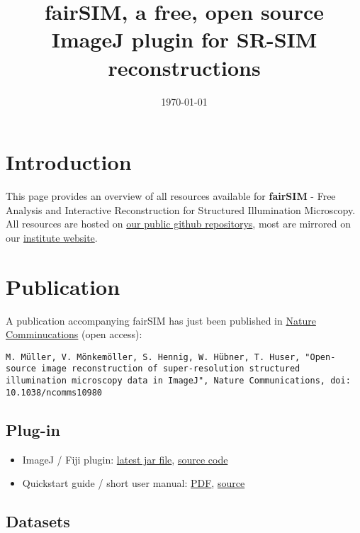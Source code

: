 \documentclass[twoside=false,
           a4paper,
           10pt,DIV=16,parindent=none,parskip=half]{article}
\title{fairSIM, a free, open source ImageJ plugin for SR-SIM reconstructions}
\date{\small \today}
\begin{document}
\maketitle


\section*{Introduction}
This page provides an overview of all resources available
for \textbf{fairSIM}  - Free Analysis and Interactive Reconstruction for Structured Illumination Microscopy.
\\
All resources are hosted on \href{https://github.com/fairSIM}{our public github repositorys},
most are mirrored on our \href{http://www.physik.uni-bielefeld.de/fairsim}{institute website}.

\section*{Publication}

A publication accompanying fairSIM has just been published in
\href{http://www.nature.com/ncomms/2016/160321/ncomms10980/abs/ncomms10980.html}{Nature Comminucations} (open access):

\texttt{M. Müller, V. Mönkemöller, S. Hennig, W. Hübner, T. Huser, 
"Open-source image reconstruction of super-resolution structured illumination
microscopy data in ImageJ", Nature Communications, doi: 10.1038/ncomms10980}


\subsection*{Plug-in}
\begin{itemize}
\item 
ImageJ / Fiji plugin:
\href{https://github.com/fairSIM/fairSIM/releases/latest}{latest jar file},
\href{https://github.com/fairSIM/fairSIM/}{source code}
\item
Quickstart guide / short user manual:
\href{https://github.com/fairSIM/documentation/releases/latest}{PDF},
\href{https://github.com/fairSIM/documentation}{source}
\end{itemize}


\subsection*{Datasets}
\end{document}
